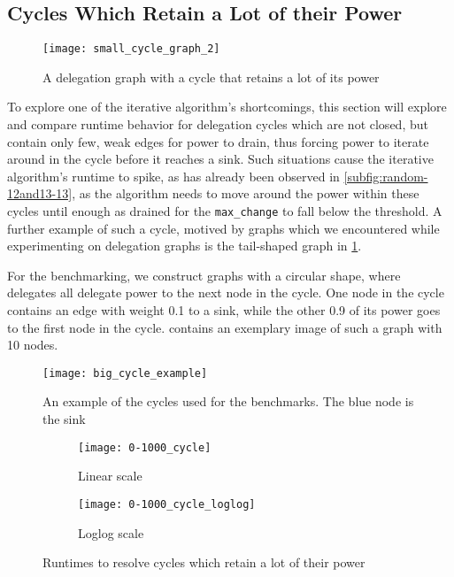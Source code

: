\subsection{Cycles Which Retain a Lot of their Power}
\label{subsec:cycles_draining}

\begin{figure}
\centering
\texttt{[image: small\_cycle\_graph\_2]}
\caption{A delegation graph with a cycle that retains a lot of its power}
\label{fig:cycle_example}
\end{figure}

To explore one of the iterative algorithm's shortcomings, this section will explore and compare runtime behavior for delegation cycles which are not closed, but contain only few, weak edges for power to drain, thus forcing power to iterate around in the cycle before it reaches a sink. Such situations cause the iterative algorithm's runtime to spike, as has already been observed in \cref{subfig:random-12and13-13}, as the algorithm needs to move around the power within these cycles until enough as drained for the \texttt{max\_change} to fall below the threshold. A further example of such a cycle, motived by graphs which we encountered while experimenting on delegation graphs is the tail-shaped graph in \cref{fig:cycle_example}. 

For the benchmarking, we construct graphs with a circular shape, where delegates all delegate power to the next node in the cycle. One node in the cycle contains an edge with weight 0.1 to a sink, while the other 0.9 of its power goes to the first node in the cycle.  contains an exemplary image of such a graph with 10 nodes. 

\begin{figure}[t]
	\centering
	\texttt{[image: big\_cycle\_example]}
	\caption{An example of the cycles used for the benchmarks. The blue node is the sink}
	\label{fig:big_cycle_example}
\end{figure}

\begin{figure}[t]
    \centering
    \begin{subfigure}[t]{0.45\textwidth}
    	\centering
    	\texttt{[image: 0-1000\_cycle]}
    	\caption{Linear scale}
    	\label{subfig:cycle-small-linear}
    \end{subfigure}
    \hfill
    \begin{subfigure}[t]{0.45\textwidth}
        \centering
        \texttt{[image: 0-1000\_cycle\_loglog]}
        \caption{Loglog scale}
         \label{subfig:cycle-small-loglog}
    \end{subfigure}
    \caption{Runtimes to resolve cycles which retain a lot of their power}
    \label{fig:cycle_small}
\end{figure}

